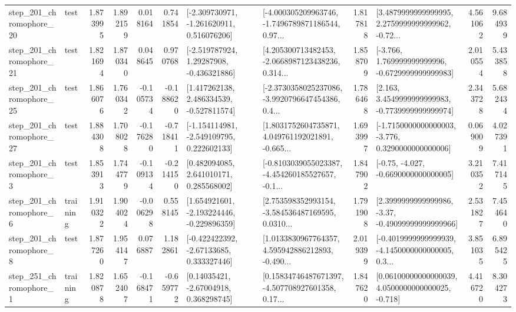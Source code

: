\begin{tabular}{llrrrrllrlrr}
  step\_201\_chromophore\_20 &      test &      1.873995 &    1.892159 &      0.018164 &  0.741854 &   [-2.309730971, -1.261620911, 0.516076206] &  [-4.000305209963746, -1.7496789871186544, 0.97... &       1.817818 &  [3.4879999999999995, 2.2759999999999962, -0.72... &            4.561062 &          9.684939 \\
  step\_201\_chromophore\_21 &      test &      1.821694 &    1.870340 &      0.048645 &  0.970768 &    [-2.519787924, 1.29287908, -0.436321886] &  [4.205300713482453, -2.0668987123438236, 0.314... &       1.858709 &   [-3.766, 1.769999999999996, -0.6729999999999983] &            2.010554 &          5.433858 \\
  step\_201\_chromophore\_25 &      test &      1.866076 &    1.760342 &     -0.105734 & -0.188620 &    [1.417262138, 2.486334539, -0.527811574] &  [-2.3730358025237086, -3.9920796647454386, 0.4... &       1.786468 &   [2.163, 3.4549999999999983, -0.7739999999999974] &            2.343728 &          5.682434 \\
  step\_201\_chromophore\_27 &      test &      1.884308 &    1.708028 &     -0.176280 & -0.718411 &   [-1.154114981, -2.549109795, 0.222602133] &  [1.8031752604735871, 4.049761192021891, -0.665... &       1.693997 &  [-1.7150000000000003, -3.776, 0.3290000000000006] &            0.069009 &          4.027391 \\
   step\_201\_chromophore\_3 &      test &      1.853913 &    1.744779 &     -0.109134 & -0.214150 &     [0.482094085, 2.641010171, 0.285568002] &  [-0.8103039055023387, -4.454260185527657, -0.1... &       1.847902 &               [-0.75, -4.027, -0.6690000000000005] &            3.210352 &          7.417145 \\
   step\_201\_chromophore\_6 &  training &      1.910322 &    1.904024 &     -0.006298 &  0.558145 &   [1.654921601, -2.193224446, -0.229896359] &  [2.753598352993154, -3.584536487169595, 0.0310... &       1.791908 &  [2.3999999999999986, -3.37, -0.49099999999999966] &            2.531827 &          7.454640 \\
   step\_201\_chromophore\_8 &      test &      1.877260 &    1.954147 &      0.076887 &  1.182861 &    [-0.422422392, -2.67133685, 0.333327446] &  [1.0133830967764357, 4.595942886212893, -0.490... &       2.019399 &  [-0.4019999999999939, -4.1450000000000005, 0.3... &            3.851035 &          6.895425 \\
   step\_251\_chromophore\_1 &  training &      1.820878 &    1.652407 &     -0.168471 & -0.659772 &      [0.14035421, -2.67004918, 0.368298745] &  [0.15834746487671397, -4.507708927601358, 0.17... &       1.847620 &  [0.06100000000000039, 4.0500000000000025, -0.718] &            4.416720 &          8.304273 \\

\end{tabular}
